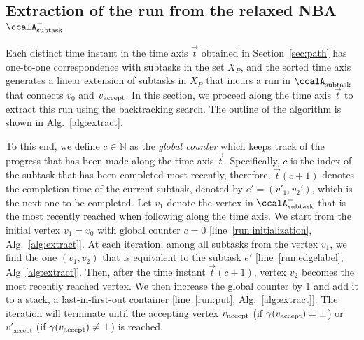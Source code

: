 \documentclass[Afour,sageh,times]{sagej}
\newcommand{\auto}[1]{\ccalA_{\textup{#1}}}
\newcommand{\vertex}[1]{v_{\textup{#1}}}
\begin{document}
{\subsection{Extraction of the run from the relaxed NBA \upshape $\auto{subtask}^-$}\label{sec:run}

Each distinct time instant in the time axis $\vec{t}$ obtained in Section~\ref{sec:path} has one-to-one correspondence with subtasks in the set $X_P$, and the sorted time axis generates a linear extension of subtasks in $X_P$ that incurs a run in $\auto{subtask}^-$ that connects $v_{0}$ and $\vertex{accept}$. In this section, we proceed along the time axis $\vec{t}$ to extract this run using the backtracking search. The outline of the algorithm is shown in Alg.~\ref{alg:extract}.

  To this end, we define $c\in \mathbb{N}$ as the {\it global counter} which keeps track of the progress that has been made along the time axis $\vec{t}$. Specifically, $c$ is the index of the subtask that  has  been completed most recently, therefore, $\vec{t}(c+1)$ denotes  the  completion time of the current subtask, denoted by $e' = (v'_1, v_2')$, which is  the next one to be completed. Let $v_1$ denote the vertex in $\auto{subtask}^-$ that is the  most recently reached when following along the time axis.  We start from the initial vertex $v_1= v_0$ with global counter $c=0$ [line~\ref{run:initialization}, Alg.~\ref{alg:extract}]. At each iteration, among all subtasks from the vertex $v_1$, we find the one $(v_1, v_2)$ that is  equivalent to the  subtask $e'$ [line~\ref{run:edgelabel}, Alg~\ref{alg:extract}]. Then, after the time instant $\vec{t}(c+1)$,  vertex $v_2$ becomes the most recently reached vertex. We then increase the global counter by 1 and add it to a stack, a last-in-first-out container [line~\ref{run:put}, Alg.~\ref{alg:extract}]. The iteration will terminate until the accepting vertex $\vertex{accept}$ (if $\gamma(\vertex{accept}) = \bot$) or $v'_{\text{accept}}$ (if $\gamma(\vertex{accept})\neq \bot$) is reached.


}
\end{document}

